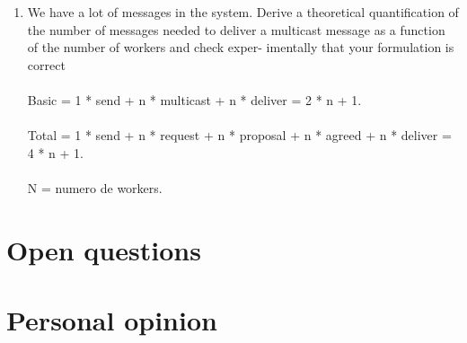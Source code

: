 \documentclass[a4paper, 10pt]{article}
\begin{document}
\begin{enumerate}
\\\item We have a lot of messages in the system. Derive a theoretical quantification of the number of messages needed to deliver a multicast message as a function of the number of workers and check exper- imentally that your formulation is correct\\\\
Basic = 1 * send + n * multicast + n * deliver = 2 * n + 1.\\\\
Total = 1 * send + n * request + n * proposal + n * agreed + n * deliver = 4 * n + 1.\\\\
N = numero de workers.

\end{enumerate}

\newpage
\section{Open questions}

\newpage
\section{Personal opinion}
\end{document}
